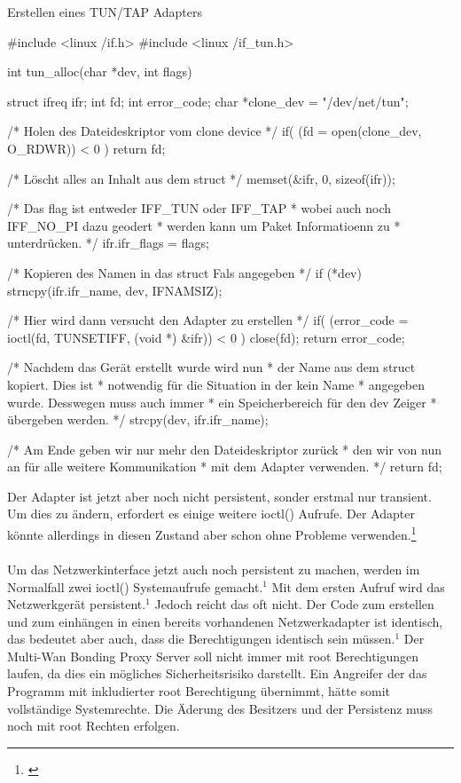 \begin{program}[H]
    \caption{Erstellen eines TUN/TAP Adapters}
    \begin{CppCode}
#include <linux /if.h>
#include <linux /if_tun.h>

int tun_alloc(char *dev, int flags) {
    struct ifreq ifr;
    int fd;
    int error_code;
    char *clone_dev = "/dev/net/tun";

    /* Holen des Dateideskriptor vom clone device */
    if( (fd = open(clone_dev, O_RDWR)) < 0 ) {
        return fd;
    }

    /* Löscht alles an Inhalt aus dem struct */
    memset(&ifr, 0, sizeof(ifr));

    /* Das flag ist entweder IFF_TUN oder IFF_TAP
    * wobei auch noch IFF_NO_PI dazu geodert 
    * werden kann um Paket Informatioenn zu 
    * unterdrücken.
    */
    ifr.ifr_flags = flags;   

    /* Kopieren des Namen in das struct Fals angegeben */
    if (*dev) {
        strncpy(ifr.ifr_name, dev, IFNAMSIZ);
    }

    /* Hier wird dann versucht den Adapter zu erstellen */
    if( (error_code = ioctl(fd, TUNSETIFF, (void *) &ifr)) < 0 ) {
        close(fd);
        return error_code;
    }

    /* Nachdem das Gerät erstellt wurde wird nun
    * der Name aus dem struct kopiert. Dies ist 
    * notwendig für die Situation in der kein Name
    * angegeben wurde. Desswegen muss auch immer 
    * ein Speicherbereich für den dev Zeiger 
    * übergeben werden.
    */
    strcpy(dev, ifr.ifr_name);

    /* Am Ende geben wir nur mehr den Dateideskriptor zurück 
    * den wir von nun an für alle weitere Kommunikation
    * mit dem Adapter verwenden.
    */
    return fd;
}
    \end{CppCode}
\end{program}
\newpage
\noindent
Der Adapter ist jetzt aber noch nicht persistent, sonder erstmal nur transient. Um dies zu ändern, erfordert es einige weitere ioctl() Aufrufe.  Der Adapter könnte allerdings in diesen Zustand aber schon ohne Probleme verwenden.\footnote[1]{\cite[Vgl.][]{TUNTAP}}
\\\\
Um das Netzwerkinterface jetzt auch noch persistent zu machen, werden im Normalfall zwei ioctl() Systemaufrufe gemacht.$^{1}$ Mit dem ersten Aufruf wird das Netzwerkgerät persistent.$^{1}$ Jedoch reicht das oft nicht. Der Code zum erstellen und zum einhängen in einen bereits vorhandenen Netzwerkadapter ist identisch, das bedeutet aber auch, dass die Berechtigungen identisch sein müssen.$^{1}$ Der Multi-Wan Bonding Proxy Server soll nicht immer mit root Berechtigungen laufen, da dies ein mögliches Sicherheitsrisiko darstellt. Ein Angreifer der das Programm mit inkludierter root Berechtigung übernimmt, hätte somit vollständige Systemrechte. Die Äderung des Besitzers und der Persistenz muss noch mit root Rechten erfolgen.
